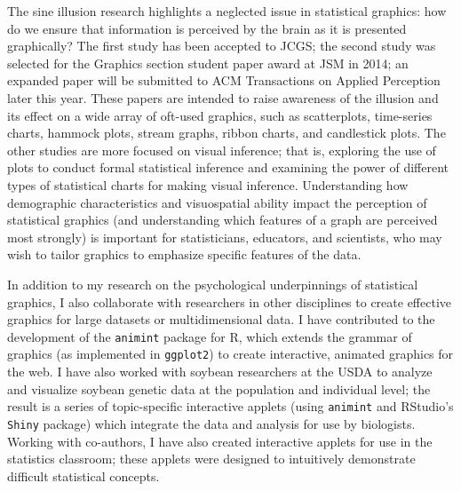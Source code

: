 \documentclass[11pt,letterpaper,sans,unicode]{moderncv}        %
\begin{document}
\vspace{.325cm}The sine illusion research highlights a neglected issue in statistical graphics: how do we ensure that information is perceived by the brain as it is presented graphically? The first study has been accepted to JCGS; the second study was selected for the Graphics section student paper award at JSM in 2014; an expanded paper will be submitted to ACM Transactions on Applied Perception later this year. These papers are intended to raise awareness of the illusion and its effect on a wide array of oft-used graphics, such as scatterplots, time-series charts, hammock plots, stream graphs, ribbon charts, and candlestick plots. The other studies are more focused on visual inference; that is, exploring the use of plots to conduct formal statistical inference and examining the power of different types of statistical charts for making visual inference. Understanding how demographic characteristics and visuospatial ability impact the perception of statistical graphics (and understanding which features of a graph are perceived most strongly) is important for statisticians, educators, and scientists, who may wish to tailor graphics to emphasize specific features of the data.

\vspace{.65cm}\hspace{8pt}In addition to my research on the psychological underpinnings of statistical graphics, I also collaborate with researchers in other disciplines to create effective graphics for large datasets or multidimensional data. I have contributed to the development of the \texttt{animint} package for R, which extends the grammar of graphics (as implemented in \texttt{ggplot2}) to create interactive, animated graphics for the web. I have also worked with soybean researchers at the USDA to analyze and visualize soybean genetic data at the population and individual level; the result is a series of topic-specific interactive applets (using \texttt{animint} and RStudio's \texttt{Shiny} package) which integrate the data and analysis for use by biologists. Working with co-authors, I have also created interactive applets for use in the statistics classroom; these applets were designed to intuitively demonstrate difficult statistical concepts. 
\end{document}
